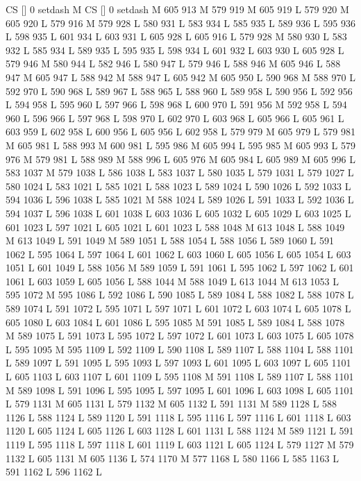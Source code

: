 {{{{{{{{{{{{{{{{{{CS [] 0 setdash M
CS [] 0 setdash M
605 913 M 579 919 M 605 919 L
579 920 M 605 920 L
579 916 M 579 928 L
580 931 L
583 934 L
585 935 L
589 936 L
595 936 L
598 935 L
601 934 L
603 931 L
605 928 L
605 916 L
579 928 M 580 930 L
583 932 L
585 934 L
589 935 L
595 935 L
598 934 L
601 932 L
603 930 L
605 928 L
579 946 M 580 944 L
582 946 L
580 947 L
579 946 L
588 946 M 605 946 L
588 947 M 605 947 L
588 942 M 588 947 L
605 942 M 605 950 L
590 968 M 588 970 L
592 970 L
590 968 L
589 967 L
588 965 L
588 960 L
589 958 L
590 956 L
592 956 L
594 958 L
595 960 L
597 966 L
598 968 L
600 970 L
591 956 M 592 958 L
594 960 L
596 966 L
597 968 L
598 970 L
602 970 L
603 968 L
605 966 L
605 961 L
603 959 L
602 958 L
600 956 L
605 956 L
602 958 L
579 979 M 605 979 L
579 981 M 605 981 L
588 993 M 600 981 L
595 986 M 605 994 L
595 985 M 605 993 L
579 976 M 579 981 L
588 989 M 588 996 L
605 976 M 605 984 L
605 989 M 605 996 L
583 1037 M 579 1038 L
586 1038 L
583 1037 L
580 1035 L
579 1031 L
579 1027 L
580 1024 L
583 1021 L
585 1021 L
588 1023 L
589 1024 L
590 1026 L
592 1033 L
594 1036 L
596 1038 L
585 1021 M 588 1024 L
589 1026 L
591 1033 L
592 1036 L
594 1037 L
596 1038 L
601 1038 L
603 1036 L
605 1032 L
605 1029 L
603 1025 L
601 1023 L
597 1021 L
605 1021 L
601 1023 L
588 1048 M 613 1048 L
588 1049 M 613 1049 L
591 1049 M 589 1051 L
588 1054 L
588 1056 L
589 1060 L
591 1062 L
595 1064 L
597 1064 L
601 1062 L
603 1060 L
605 1056 L
605 1054 L
603 1051 L
601 1049 L
588 1056 M 589 1059 L
591 1061 L
595 1062 L
597 1062 L
601 1061 L
603 1059 L
605 1056 L
588 1044 M 588 1049 L
613 1044 M 613 1053 L
595 1072 M 595 1086 L
592 1086 L
590 1085 L
589 1084 L
588 1082 L
588 1078 L
589 1074 L
591 1072 L
595 1071 L
597 1071 L
601 1072 L
603 1074 L
605 1078 L
605 1080 L
603 1084 L
601 1086 L
595 1085 M 591 1085 L
589 1084 L
588 1078 M 589 1075 L
591 1073 L
595 1072 L
597 1072 L
601 1073 L
603 1075 L
605 1078 L
595 1095 M 595 1109 L
592 1109 L
590 1108 L
589 1107 L
588 1104 L
588 1101 L
589 1097 L
591 1095 L
595 1093 L
597 1093 L
601 1095 L
603 1097 L
605 1101 L
605 1103 L
603 1107 L
601 1109 L
595 1108 M 591 1108 L
589 1107 L
588 1101 M 589 1098 L
591 1096 L
595 1095 L
597 1095 L
601 1096 L
603 1098 L
605 1101 L
579 1131 M 605 1131 L
579 1132 M 605 1132 L
591 1131 M 589 1128 L
588 1126 L
588 1124 L
589 1120 L
591 1118 L
595 1116 L
597 1116 L
601 1118 L
603 1120 L
605 1124 L
605 1126 L
603 1128 L
601 1131 L
588 1124 M 589 1121 L
591 1119 L
595 1118 L
597 1118 L
601 1119 L
603 1121 L
605 1124 L
579 1127 M 579 1132 L
605 1131 M 605 1136 L
574 1170 M 577 1168 L
580 1166 L
585 1163 L
591 1162 L
596 1162 L
}}}}}}}}}}}}}}}}}}
